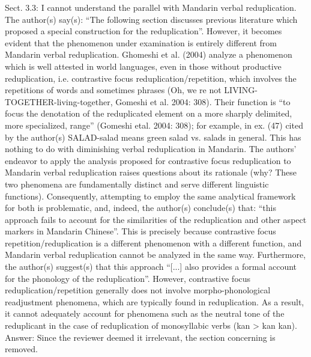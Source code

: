 \documentclass[fleqn,twoside]{article}
\begin{document}
{%
Sect. 3.3: I cannot understand the parallel with Mandarin verbal reduplication. The
author(s) say(s): “The following section discusses previous literature which proposed a special
construction for the reduplication”. However, it becomes evident that the phenomenon under
examination is entirely different from Mandarin verbal reduplication. Ghomeshi et al. (2004) analyze
a phenomenon which is well attested in world languages, even in those without productive
reduplication, i.e. contrastive focus reduplication/repetition, which involves the repetitions of
words and sometimes phrases (Oh, we re not LIVING-TOGETHER-living-together, Gomeshi et al. 2004: 308). Their function is “to focus the denotation of the reduplicated element on a more sharply delimited, more specialized, range” (Gomeshi etal. 2004: 308); for example, in ex. (47) cited by the author(s) SALAD-salad means green salad vs. salads in general. This has nothing to do with diminishing verbal reduplication in Mandarin. The authors’ endeavor to apply the analysis proposed for contrastive focus reduplication to Mandarin verbal reduplication raises questions about its rationale (why? These two phenomena are fundamentally distinct and serve different linguistic functions). Consequently, attempting to employ the same analytical framework for both is problematic, and, indeed, the author(s) conclude(s) that: “this approach fails to account for the similarities of the reduplication and other aspect markers in Mandarin Chinese”. This is precisely because contrastive focus repetition/reduplication is a different phenomenon with a different function, and Mandarin verbal reduplication cannot be analyzed in the same way. Furthermore, the author(s) suggest(s) that this approach “[...] also provides a formal account for the phonology of the reduplication”. However, contrastive focus reduplication/repetition generally does not involve morpho-phonological readjustment phenomena, which are typically found in reduplication. As a result, it cannot adequately account for phenomena such as the neutral tone of the reduplicant in the case of reduplication of monosyllabic verbs (kan > kan kan).
Answer:
Since the reviewer deemed it irrelevant, the section concerning \citet{Ghomeshietal2004} is removed.

}
\end{document}
